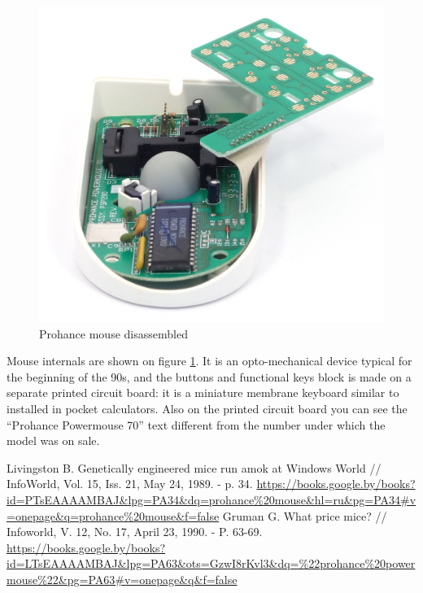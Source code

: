 \documentclass[11pt, a4paper]{article}
\begin{document}
\begin{figure}[h]
    \centering
    \includegraphics[scale=0.8]{1989_prohance_powermouse/inside_60.jpg}
    \caption{Prohance mouse disassembled}
    \label{fig:ProhanceInside}
\end{figure}

Mouse internals are shown on figure \ref{fig:ProhanceInside}. It is an opto-mechanical device typical for the beginning of the 90s, and the buttons and functional keys block is made on a separate printed circuit board: it is a miniature membrane keyboard similar to installed in pocket calculators. Also on the printed circuit board you can see the “Prohance Powermouse 70” text different from the number under which the model was on sale.

\begin{thebibliography}{9}
 Livingston B. Genetically engineered mice run amok at Windows World // InfoWorld, Vol. 15, Iss. 21, May 24, 1989. - p. 34. \url{https://books.google.by/books?id=PTsEAAAAMBAJ&lpg=PA34&dq=prohance%20mouse&hl=ru&pg=PA34#v=onepage&q=prohance%20mouse&f=false}
 Gruman G. What price mice? // Infoworld, V. 12, No. 17, April 23, 1990. - P. 63-69. \url{https://books.google.by/books?id=LTsEAAAAMBAJ&lpg=PA63&ots=GzwI8rKvl3&dq=%22prohance%20powermouse%22&pg=PA63#v=onepage&q&f=false}
\end{thebibliography}
\end{document}
